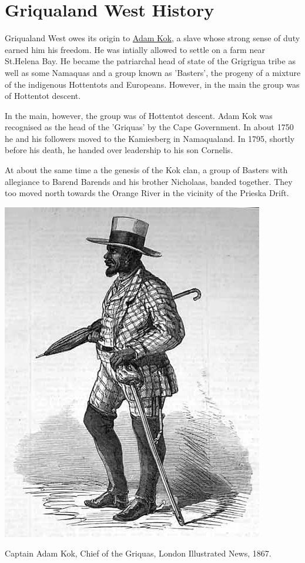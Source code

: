 \chapter{Griqualand West History}    

Griqualand West owes its origin to \href{ http://en.wikipedia.org/wiki/Adam_Kok}{Adam Kok}, a slave whose strong sense of duty earned him his freedom. He was intially allowed to settle on a farm near St.Helena Bay. He became the patriarchal head of state of the Grigrigua tribe as well as some Namaquas and a group known as 'Basters', the progeny of a mixture of the indigenous Hottentots and Europeans. However, in the main the group was of Hottentot descent.




In the main, however, the group was of Hottentot descent. Adam Kok was recognised as the head of the 'Griquas' by the Cape Government. In about 1750 he and his followers moved to the Kamiesberg in Namaqualand. In 1795, shortly before his death, he handed over leadership to his son Cornelis.

At about the same time a the genesis of the Kok clan, a group of Basters with allegiance to Barend Barends and his brother Nicholaas, banded together. They too moved north towards the Orange River in the vicinity of the Prieska Drift.

\begin{marginfigure}
\includegraphics[width=.98\textwidth]{../cape-of-good-hope/history/adam-kok.jpg}
\caption{Captain Adam Kok, Chief of the Griquas, London Illustrated News, 1867.}
\end{marginfigure}

